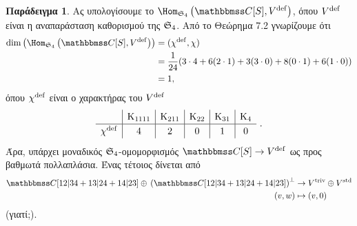\documentclass[12pt,a4paper,reqno]{amsart}
\theoremstyle{definition}
\newtheorem*{example}{Παράδειγμα}
\begin{document}
\begin{example}
Ας υπολογίσουμε το $\Hom_{\fS_4}\left(\CC[S],V^\rmdef\right)$, όπου $V^{\mathrm{def}}$ είναι η αναπαράσταση καθορισμού της $\mathfrak{S}_4$. Από το Θεώρημα 7.2 γνωρίζουμε ότι 
\begin{align*}
\dim\left(\Hom_{\fS_4}\left(\CC[S],V^\rmdef\right)\right)
&= (\chi^\rmdef,\chi) \\
&= \frac{1}{24}(3\cdot4 + 6(2\cdot1) + 3(3\cdot0) + 8(0\cdot1) + 6(1\cdot0)) \\
&= 1,
\end{align*}
όπου $\chi^{\mathrm{def}}$ είναι ο χαρακτήρας του $V^{\mathrm{def}}$
\[
\renewcommand{\arraystretch}{1.2} 
\begin{array}{c|c|c|c|c|c}
            & \rmK_{1111}  & \rmK_{211}  & \rmK_{22} & \rmK_{31} & \rmK_4  \\ \hline
\chi^\rmdef & 4            & 2           & 0         & 1         & 0 
\end{array}\ .
\]
Άρα, υπάρχει μοναδικός $\mathfrak{S}_4$-ομομορφισμός $\CC[S] \to V^\rmdef$ ως προς βαθμωτά πολλαπλάσια. Ένας τέτοιος δίνεται από 
\begin{align*}
    \CC[12\vert34 + 13\vert24 + 14\vert23] \oplus \, \left(\CC[12\vert34 + 13\vert24 + 14\vert23]\right)^\perp &\to V^\triv \oplus V^\std \\
    (v,w) &\mapsto (v,0)
\end{align*}
(γιατί;).
\end{example}
\end{document}
